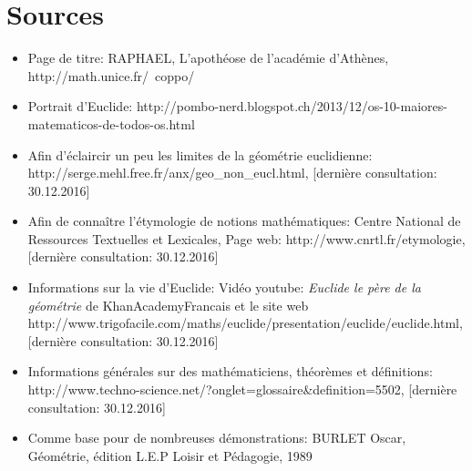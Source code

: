 \documentclass[a4paper,12pt]{article}
\begin{document}
\section{Sources}
\begin{itemize}
    \item Page de titre: RAPHAEL, L'apothéose de l'académie d'Athènes,\\ http://math.unice.fr/~coppo/
    
    \item Portrait d'Euclide: http://pombo-nerd.blogspot.ch/2013/12/os-10-maiores-matematicos-de-todos-os.html
    
    \item Afin d'éclaircir un peu les limites de la géométrie euclidienne: http://serge.mehl.free.fr/anx/geo\_non\_eucl.html, [dernière consultation: 30.12.2016]
    
    \item Afin de connaître l'étymologie de notions mathématiques: Centre National de Ressources Textuelles et Lexicales, Page web: http://www.cnrtl.fr/etymologie, [dernière consultation: 30.12.2016]
    
    \item Informations sur la vie d'Euclide: Vidéo youtube: \textit{Euclide le père de la géométrie} de KhanAcademyFrancais et le site web http://www.trigofacile.com/maths/euclide/presentation/euclide/euclide.html, [dernière consultation: 30.12.2016]
    
    \item Informations générales sur des mathématiciens, théorèmes et définitions: http://www.techno-science.net/?onglet=glossaire\&definition=5502, [dernière consultation: 30.12.2016]
    
    \item  Comme base pour de nombreuses démonstrations: BURLET Oscar, Géométrie, édition L.E.P Loisir et Pédagogie, 1989
\end{itemize}
\end{document}
